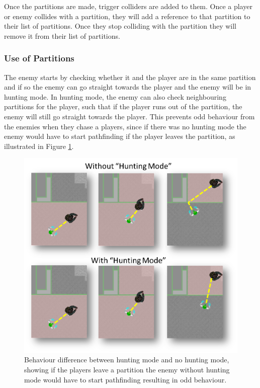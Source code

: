 Once the partitions are made, trigger colliders are added to them.
Once a player or enemy collides with a partition, they will add a reference to that partition to their list of partitions.
Once they stop colliding with the partition they will remove it from their list of partitions.

\subsubsection*{Use of Partitions}
The enemy starts by checking whether it and the player are in the same partition and if so the enemy can go straight towards the player and the enemy will be in hunting mode.
In hunting mode, the enemy can also check neighbouring partitions for the player, such that if the player runs out of the partition, the enemy will still go straight towards the player.
This prevents odd behaviour from the enemies when they chase a players, since if there was no hunting mode the enemy would have to start pathfinding if the player leaves the partition, as illustrated in Figure \ref{huntingMode}.

\begin{figure}[H]
\begin{center}
        \includegraphics[width=\textwidth]{figures/astar/huntingMode.png}
    \caption{Behaviour difference between hunting mode and no hunting mode, showing if the players leave a partition the enemy without hunting mode would have to start pathfinding resulting in odd behaviour.}\label{huntingMode}
\end{center}
\end{figure}

